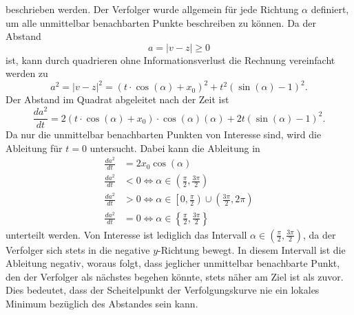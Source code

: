 beschrieben werden. Der Verfolger wurde allgemein für jede Richtung $\alpha$ definiert, um alle unmittelbar benachbarten Punkte beschreiben zu können.
Da der Abstand
\begin{equation}
	a
	=
	|v-z|
	\geq
	0
\end{equation}
ist, kann durch quadrieren ohne Informationsverlust die Rechnung vereinfacht werden zu
\begin{equation}
	a^2
	=
	|v-z|^2
	=
	(t\cdot\cos(\alpha)+x_0)^2+t^2(\sin(\alpha)-1)^2
	\text{.}
\end{equation}
Der Abstand im Quadrat abgeleitet nach der Zeit ist
\begin{equation}
	\frac{d a^2}{d t}
	=
	2(t\cdot\cos (\alpha)+x_0)\cdot\cos(\alpha)(\alpha)+2t(\sin(\alpha)-1)^2
	\text{.}
\end{equation}
Da nur die unmittelbar benachbarten Punkten von Interesse sind, wird die Ableitung für $t=0$ untersucht. Dabei kann die Ableitung in 
\begin{align}
	\frac{d a^2}{d t}
	&=
	2x_0\cos(\alpha)
	\\
	\frac{d a^2}{d t}
	&<
	0\Leftrightarrow\alpha\in\left( \frac{\pi}{2}, \frac{3\pi}{2}\right)
	\\
	\frac{d a^2}{d t}
	&>
	0\Leftrightarrow\alpha\in\left[0, \frac{\pi}{2}\right)\cup\left(\frac{3\pi}{2}, 2\pi\right)
	\\
	\frac{d a^2}{d t}
	&=
	0\Leftrightarrow\alpha\in\left\{ \frac{\pi}{2}, \frac{3\pi}{2}\right\}
\end{align}
unterteilt werden.
Von Interesse ist lediglich das Intervall $\alpha\in\left( \frac{\pi}{2}, \frac{3\pi}{2}\right)$, da der Verfolger sich stets in die negative $y$-Richtung bewegt.
In diesem Intervall ist die Ableitung negativ, woraus folgt, dass jeglicher unmittelbar benachbarte Punkt, den der Verfolger als nächstes begehen könnte, stets näher am Ziel ist als zuvor.
Dies bedeutet, dass der Scheitelpunkt der Verfolgungskurve nie ein lokales Minimum bezüglich des Abstandes sein kann.


